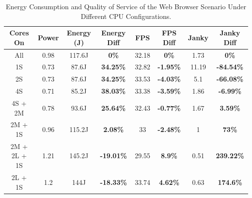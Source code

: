 \documentclass[conference]{IEEEtran}
\begin{document}
\begin{table}
\renewcommand{\arraystretch}{1.3}
\caption{Energy Consumption and Quality of Service of the Web Browser Scenario Under Different CPU Configurations.}
\label{tab:energyweb}
\centering
\begin{tabular}{|c|c|c|c|c|c|c|c|}
\hline
\textbf{Cores On} & \textbf{Power} & \textbf{Energy (J)} & \textbf{Energy Diff} &  \textbf{FPS} & \textbf{FPS Diff} & \textbf{Janky} & \textbf{Janky Diff} \\
\hline
      All & 0.98 & 117.6J & \textbf{0\%}  & 32.18 & \textbf{0\%} & 1.73 & \textbf{0\%}  \\ 
      1S & 0.73 & 87.6J & \textbf{34.25\%} & 32.82 & \textbf{-1.95\%}  & 11.19 & \textbf{-84.54\%} \\
      2S & 0.73 & 87.6J & \textbf{34.25\%} & 33.53 & \textbf{-4.03\%} & 5.1 & \textbf{-66.08\%} \\
      4S & 0.71 & 85.2J & \textbf{38.03\%} & 33.38 & \textbf{-3.59\%} & 1.86 & \textbf{-6.99\%} \\
      4S + 2M & 0.78 & 93.6J & \textbf{25.64\%} & 32.43 & \textbf{-0.77\%} &1.67 & \textbf{3.59\%} \\
      2M + 1S & 0.96 & 115.2J & \textbf{2.08\%} & 33 & \textbf{-2.48\%}  & 1 & \textbf{73\%} \\
      2M + 2L + 1S & 1.21 & 145.2J & \textbf{-19.01\%}  & 29.55 & \textbf{8.9\%} & 0.51 & \textbf{239.22\%} \\
      2L + 1S & 1.2 & 144J & \textbf{-18.33\%} & 33.74 & \textbf{4.62\%} & 0.63 & \textbf{174.6\%} \\
      
      \hline
\end{tabular}
\end{table}
\end{document}
